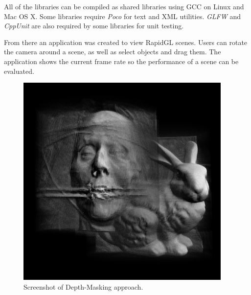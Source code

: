 \documentclass{report}
\begin{document}
All of the libraries can be compiled as shared libraries using GCC on Linux and
Mac OS X.  Some libraries require {\em Poco} for text and XML utilities.  {\em
GLFW} and {\em CppUnit} are also required by some libraries for unit testing.

From there an application was created to view RapidGL scenes.  Users can
rotate the camera around a scene, as well as select objects and drag them.  The
application shows the current frame rate so the performance of a scene can be
evaluated.

\begin{figure}
\centering
\includegraphics[width=0.95\textwidth]{boolean-and-screenshot.png}
\caption{Screenshot of Depth-Masking approach.}
\end{figure}
\end{document}

